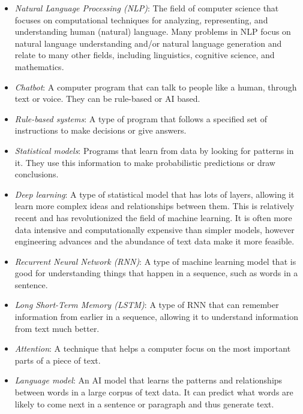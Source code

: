 \documentclass[12pt]{article}
\begin{document}
\begin{itemize}
    \item \textit{Natural Language Processing (NLP)}\label{item:nlp}: The field of computer science that focuses on computational techniques for analyzing, representing, and understanding human (natural) language. Many problems in NLP focus on natural language understanding and/or natural language generation and relate to many other fields, including linguistics, cognitive science, and mathematics.
    \item \textit{Chatbot}\label{item:chatbot}: A computer program that can talk to people like a human, through text or voice. They can be rule-based or AI based.
    
    \item \textit{Rule-based systems}\label{item:rule-based}: A type of program that follows a specified set of instructions to make decisions or give answers.
    
    \item \textit{Statistical models}\label{item:statistical}: Programs that learn from data by looking for patterns in it. They use this information to make probabilistic predictions or draw conclusions. 
    
    \item \textit{Deep learning}\label{item:deep-learning}: A type of statistical model that has lots of layers, allowing it learn more complex ideas and relationships between them. This is relatively recent and has revolutionized the field of machine learning. It is often more data intensive and computationally expensive than simpler models, however engineering advances and the abundance of text data make it more feasible.
    
    \item \textit{Recurrent Neural Network (RNN)}\label{item:rnn}: A type of machine learning model that is good for understanding things that happen in a sequence, such as words in a sentence.
    
    \item \textit{Long Short-Term Memory (LSTM)}\label{item:lstm}: A type of RNN that can remember information from earlier in a sequence, allowing it to understand information from text much better.

    \item \textit{Attention}\label{item:attention}: A technique that helps a computer focus on the most important parts of a piece of text.

    \item \textit{Language model}\label{item:language-modeling}: An AI model that  learns the patterns and relationships between words in a large corpus of text data. It can predict what words are likely to come next in a sentence or paragraph and thus generate text. 
    

\end{itemize}
\end{document}
